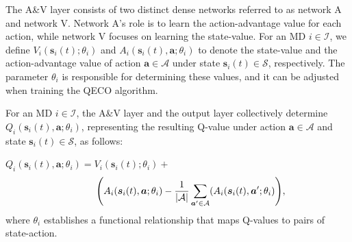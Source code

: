 \documentclass[10pt, journal,letterpaper]{IEEEtran}
\begin{document}
The A\&V layer consists of two distinct dense networks referred to as network A and network V. Network A's role is to learn the action-advantage value for each action, while network V focuses on learning the state-value. For an MD $i \in \mathcal{I}$, we define $V_i(\boldsymbol{s}_i(t); \theta_i)$ and $A_i(\boldsymbol{s}_i(t), \boldsymbol{a}; \theta_i)$ to denote the state-value and the action-advantage value of action $\boldsymbol{a} \in \mathcal{A}$ under state $\boldsymbol{s}_i(t) \in \mathcal{S}$, respectively. The parameter $\theta_i$ is responsible for determining these values, and it can be adjusted when training the QECO algorithm.

For an MD $i \in \mathcal{I}$, the A\&V layer and the output layer collectively determine $Q_i(\boldsymbol{s}_i(t), \boldsymbol{a}; \theta_i)$, representing the resulting Q-value under action $\boldsymbol{a} \in \mathcal{A}$ and state $\boldsymbol{s}_i(t) \in \mathcal{S}$, as follows: \vspace{1.7mm}
 

$Q_i(\boldsymbol{s}_i(t), \boldsymbol{a}; \theta_i) = V_i(\boldsymbol{s}_i(t);\theta_i) +$
\begin{alignat}{1}
	\hspace{0.94cm} \Bigg( A_i(\boldsymbol{s}_i(t),\boldsymbol{a};\theta_i) - {1 \over |\mathcal{A}|} \sum\limits_{\boldsymbol{a}' \in \mathcal{A}}(A_i(\boldsymbol{s}_i(t),\boldsymbol{a}';\theta_i) \Bigg),
	\label{25}  
\end{alignat}
where $\theta_i$ establishes a functional relationship that maps Q-values to pairs of state-action.

\end{document}

